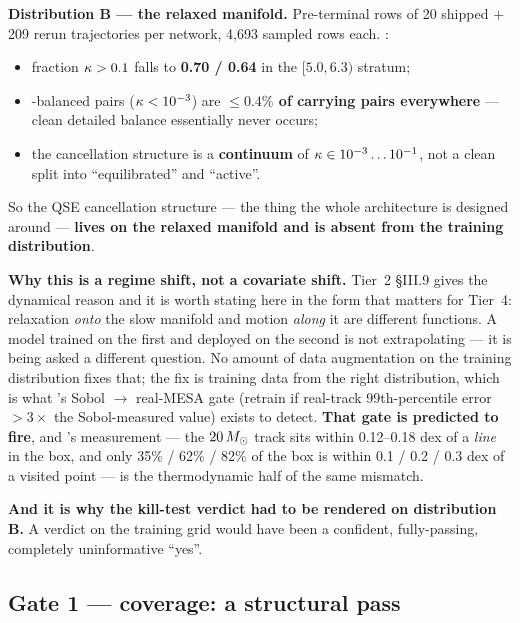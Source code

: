 \textbf{Distribution B --- the relaxed manifold.} Pre-terminal rows of 20
shipped $+$ 209 rerun trajectories per network, 4,693 sampled rows each.
:

\begin{itemize}
\item fraction $\kappa > 0.1$ falls to \textbf{0.70 / 0.64} in the \Tn{}
  $[5.0, 6.3)$ stratum;
\item \kap-balanced pairs ($\kappa < 10^{-3}$) are \textbf{$\le 0.4\%$ of
  carrying pairs everywhere} --- clean detailed balance essentially never
  occurs;
\item the cancellation structure is a \textbf{continuum} of
  $\kappa \in 10^{-3} \ldots 10^{-1}$, not a clean split into ``equilibrated''
  and ``active''.
\end{itemize}

So the QSE cancellation structure --- the thing the whole architecture is
designed around --- \textbf{lives on the relaxed manifold and is absent from the
training distribution}.

\textbf{Why this is a regime shift, not a covariate shift.} Tier~2 \S III.9
gives the dynamical reason and it is worth stating here in the form that
matters for Tier~4: relaxation \emph{onto} the slow manifold and motion
\emph{along} it are different functions. A model trained on the first and
deployed on the second is not extrapolating --- it is being asked a different
question. No amount of data augmentation on the training distribution fixes
that; the fix is training data from the right distribution, which is what
's Sobol $\to$ real-MESA gate (retrain if real-track
99th-percentile \Ye{} error $> 3\times$ the Sobol-measured value) exists to
detect. \textbf{That gate is predicted to fire}, and 's
measurement --- the $20\,M_{\odot}$ track sits within 0.12--0.18 dex of a
\emph{line} in the box, and only 35\% / 62\% / 82\% of the box is within 0.1 /
0.2 / 0.3 dex of a visited point --- is the thermodynamic half of the same
mismatch.

\textbf{And it is why the kill-test verdict had to be rendered on distribution
B.} A verdict on the training grid would have been a confident, fully-passing,
completely uninformative ``yes''.

\subsection{Gate 1 --- \texorpdfstring{\Ye}{Ye} coverage: a structural pass}
\label{sec:gate1}

